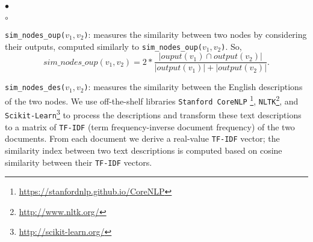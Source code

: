 \documentclass{new_tlp}
\begin{document}
{\begin{list}{$\bullet$}{\itemsep=0pt \parsep=1pt \topsep=1pt \leftmargin=10pt}
\begin{list}{$\circ$}{\itemsep=0pt \topsep=0pt \parsep=0pt \leftmargin=6pt}
	\item \texttt{sim\_nodes\_oup($v_{1},v_{2}$)}: measures the similarity between two nodes by considering their outputs, computed similarly to \texttt{sim\_nodes\_oup($v_{1},v_{2}$)}. So,\\
			$$sim\_nodes\_oup(v_{1},v_{2}) = 2*\frac{| ouput(v_{1}) \cap output(v_{2}) |}{| output(v_{1}) | + | output(v_{2}) |}.$$
	
	\item \texttt{sim\_nodes\_des($v_{1},v_{2}$)}: measures the similarity between the English descriptions of the two nodes. 
	We use off-the-shelf libraries {\small \tt Stanford CoreNLP} \footnote{ {\small \url{https://stanfordnlp.github.io/CoreNLP}}}, 
	{\small \tt NLTK}\footnote{ {\small \url{http://www.nltk.org/}}}, and {\small \tt Scikit-Learn}\footnote{ \small{\url{http://scikit-learn.org/}}} to 
	process the descriptions and transform these text descriptions to a matrix of {\small \tt TF-IDF} (term frequency-inverse document frequency) of 
	the two documents. From each document we derive a real-value {\small \tt TF-IDF} vector;  the similarity index between two text 
	descriptions is computed based on cosine similarity between their {\small \tt TF-IDF} vectors.    
	
	

\end{list}
\end{list}}
\end{document}
